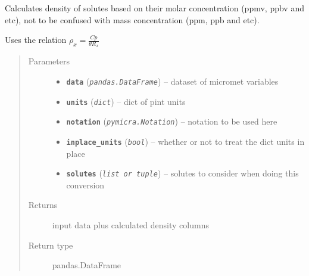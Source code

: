\documentclass[a4paper,10pt,oneside]{sphinxmanual}
\begin{document}
\begin{fulllineitems}
\label{pymicra:pymicra.physics.ppxv2density}
Calculates density of solutes based on their molar concentration (ppmv, ppbv and etc), not
to be confused with mass concentration (ppm, ppb and etc).

Uses the relation
\(\rho_x = \frac{C p}{\theta R_x}\)
\begin{quote}\begin{description}
\item[{Parameters}] \leavevmode\begin{itemize}
\item {} 
\textbf{\texttt{data}} (\emph{\texttt{pandas.DataFrame}}) -- dataset of micromet variables

\item {} 
\textbf{\texttt{units}} (\emph{\texttt{dict}}) -- dict of pint units

\item {} 
\textbf{\texttt{notation}} (\emph{\texttt{pymicra.Notation}}) -- notation to be used here

\item {} 
\textbf{\texttt{inplace\_units}} (\emph{\texttt{bool}}) -- whether or not to treat the dict units in place

\item {} 
\textbf{\texttt{solutes}} (\emph{\texttt{list or tuple}}) -- solutes to consider when doing this conversion

\end{itemize}

\item[{Returns}] \leavevmode
input data plus calculated density columns

\item[{Return type}] \leavevmode
pandas.DataFrame

\end{description}\end{quote}

\end{fulllineitems}

\end{document}
